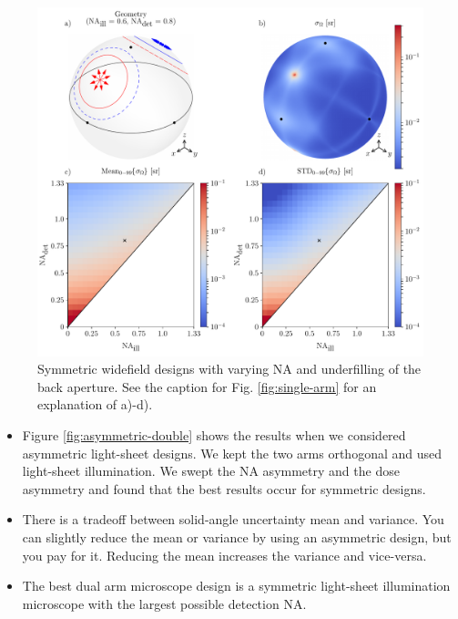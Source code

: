 \documentclass[10pt]{article}
\begin{document}
\begin{figure}[htbp]
\centering\includegraphics[width=\textwidth]{double-arm}
\caption{Symmetric widefield designs with varying NA and underfilling of the
  back aperture. See the caption for Fig. \ref{fig:single-arm} for an
  explanation of a)-d).}
\label{fig:double-arm}
\end{figure}

\begin{itemize}
\item Figure \ref{fig:asymmetric-double} shows the results when we considered
  asymmetric light-sheet designs. We kept the two arms orthogonal and used light-sheet
  illumination. We swept the NA asymmetry and the dose asymmetry and found that the
  best results occur for symmetric designs. 
\item There is a tradeoff between solid-angle uncertainty mean and variance. You
  can slightly reduce the mean or variance by using an asymmetric design, but
  you pay for it. Reducing the mean increases the variance and vice-versa.
\item The best dual arm microscope design is a symmetric light-sheet
  illumination microscope with the largest possible detection NA.
\end{itemize}
\end{document}
